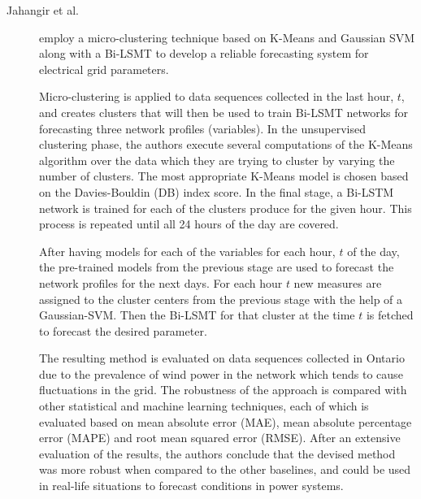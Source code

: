 \begin{description}
    \item[Jahangir et al.]\cite{Jahangir.Tayarani.ea_DeepLearningBasedForecasting_2021} employ a micro-clustering technique based on K-Means and Gaussian SVM along with a Bi-LSMT to develop a reliable forecasting system for electrical grid parameters. 
    
    Micro-clustering is applied to data sequences collected in the last hour, $t$, and creates clusters that will then be used to train Bi-LSMT networks for forecasting three network profiles (variables). In the unsupervised clustering phase, the authors execute several computations of the K-Means algorithm over the data which they are trying to cluster by varying the number of clusters. The most appropriate K-Means model is chosen based on the Davies-Bouldin (DB) index score. In the final stage, a Bi-LSTM network is trained for each of the clusters produce for the given hour. This process is repeated until all 24 hours of the day are covered.

    After having models for each of the variables for each hour, $t$ of the day, the pre-trained models from the previous stage are used to forecast the network profiles for the next days. For each hour $t$ new measures are assigned to the cluster centers from the previous stage with the help of a Gaussian-SVM. Then the Bi-LSMT for that cluster at the time $t$ is fetched to forecast the desired parameter. 

    The resulting method is evaluated on data sequences collected in Ontario due to the prevalence of wind power in the network which tends to cause fluctuations in the grid. The robustness of the approach is compared with other statistical and machine learning techniques, each of which is evaluated based on mean absolute error (MAE), mean absolute percentage error (MAPE) and root mean squared error (RMSE). After an extensive evaluation of the results, the authors conclude that the devised method was more robust when compared to the other baselines, and could be used in real-life situations to forecast conditions in power systems.
\end{description}

